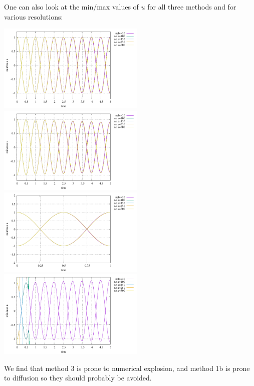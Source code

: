 One can also look at the min/max values of $u$ for all three methods and 
for various resolutions:
\begin{center}
\includegraphics[width=7cm]{python_codes/fieldstone_164/results1/stats_meth1a.pdf}
\includegraphics[width=7cm]{python_codes/fieldstone_164/results1/stats_meth1b.pdf}\\
\includegraphics[width=7cm]{python_codes/fieldstone_164/results1/stats_meth2.pdf}
\includegraphics[width=7cm]{python_codes/fieldstone_164/results1/stats_meth3.pdf}
\end{center}
We find that method 3 is prone to numerical explosion, and method 
1b is prone to diffusion so they should probably be avoided.


